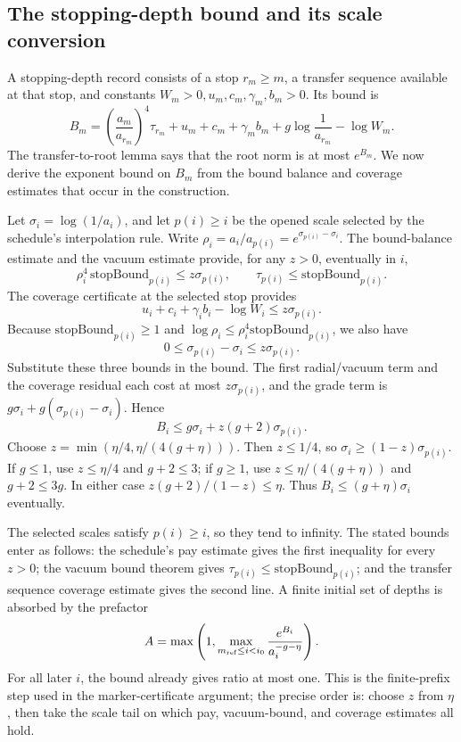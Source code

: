 \subsection{The stopping-depth bound and its scale conversion}

A stopping-depth record consists of a stop $r_m\geq m$, a transfer sequence available at that stop, and constants $W_m>0,u_m,c_m,\gamma_m,b_m>0$. Its bound is
\[
 B_m=\left(\frac{a_m}{a_{r_m}}\right)^4\tau_{r_m}+u_m+c_m+\gamma_m b_m
          +g\log\frac1{a_{r_m}}-\log W_m.
\]
The transfer-to-root lemma says that the root norm is at most $e^{B_m}$. We now derive the exponent bound on $B_m$ from the bound balance and coverage estimates that occur in the construction.

Let $\sigma_i=\log(1/a_i)$, and let $p(i)\geq i$ be the opened scale selected by the schedule's interpolation rule. Write $\rho_i=a_i/a_{p(i)}=e^{\sigma_{p(i)}-\sigma_i}$. The bound-balance estimate and the vacuum estimate provide, for any $z>0$, eventually in $i$,
\[
 \rho_i^4\,\mathrm{stopBound}_{p(i)}\leq z\sigma_{p(i)},\qquad
 \tau_{p(i)}\leq\mathrm{stopBound}_{p(i)}.
\]
The coverage certificate at the selected stop provides
\[
 u_i+c_i+\gamma_i b_i-\log W_i\leq z\sigma_{p(i)}.
\]
Because $\mathrm{stopBound}_{p(i)}\geq1$ and $\log\rho_i\leq\rho_i^4\mathrm{stopBound}_{p(i)}$, we also have
\[
 0\leq\sigma_{p(i)}-\sigma_i\leq z\sigma_{p(i)}.
\]
Substitute these three bounds in the bound. The first radial/vacuum term and the coverage residual each cost at most $z\sigma_{p(i)}$, and the grade term is $g\sigma_i+g(\sigma_{p(i)}-\sigma_i)$. Hence
\[
 B_i\leq g\sigma_i+z(g+2)\sigma_{p(i)}.
\]
Choose $z=\min(\eta/4,\eta/(4(g+\eta)))$. Then $z\leq1/4$, so $\sigma_i\geq(1-z)\sigma_{p(i)}$. If $g\leq1$, use $z\leq\eta/4$ and $g+2\leq3$; if $g\geq1$, use $z\leq\eta/(4(g+\eta))$ and $g+2\leq3g$. In either case $z(g+2)/(1-z)\leq\eta$. Thus $B_i\leq(g+\eta)\sigma_i$ eventually.

The selected scales satisfy $p(i)\geq i$, so they tend to infinity. The stated bounds enter as follows: the schedule's pay estimate gives the first inequality for every $z>0$; the vacuum bound theorem gives $\tau_{p(i)}\leq\mathrm{stopBound}_{p(i)}$; and the transfer sequence coverage estimate gives the second line. A finite initial set of depths is absorbed by the prefactor
\[
 A=\max\left(1,\max_{m_{\rm ref}\leq i<i_0}
             \frac{e^{B_i}}{a_i^{-g-\eta}}\right).
\]
For all later $i$, the bound already gives ratio at most one. This is the finite-prefix step used in the marker-certificate argument; the precise order is: choose $z$ from $\eta$, then take the scale tail on which pay, vacuum-bound, and coverage estimates all hold.

